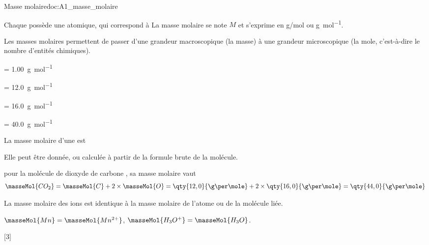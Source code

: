 \newpage
\vspace*{-36pt}
\begin{doc}{Masse molaire}{doc:A1_masse_molaire}
  \begin{importants}
    Chaque  possède une  atomique, qui correspond à 
    La masse molaire se note $M$ et s'exprime en \unit{\g/\mole} ou \unit{\g\per\mole}.
  \end{importants}
  Les masses molaires permettent de passer d'une grandeur macroscopique (la masse) à une grandeur microscopique (la mole, c'est-à-dire le nombre d'entités chimiques).

  \begin{donnees}[2]
    \item {}  = \qty{1,00}{\g\per\mole}
    \item {}  = \qty{12,0}{\g\per\mole}
    \item {}  = \qty{16,0}{\g\per\mole}
    \item {} = \qty{40,0}{\g\per\mole}
  \end{donnees}

  \begin{importants}
    La masse molaire d'une  est 
  \end{importants}
  Elle peut être donnée, ou calculée à partir de la formule brute de la molécule.

  \exemple pour la molécule de dioxyde de carbone \dioxydeDeCarbone, sa masse molaire vaut
  \begin{equation*}
    \masseMol{CO_2} = \masseMol{C} + 2 \times \masseMol{O}
    = \qty{12,0}{\g\per\mole} + 2\times\qty{16,0}{\g\per\mole}
    = \qty{44,0}{\g\per\mole}
  \end{equation*}

  \begin{importants}
    La masse molaire des ions est identique à la masse molaire de l'atome ou de la molécule liée.
  \end{importants}

  \exemples $\masseMol{Mn} = \masseMol{Mn^{2+}}$,
  $\masseMol{H_3O^{+}} = \masseMol{H_3O}$.
\end{doc}

[3]


